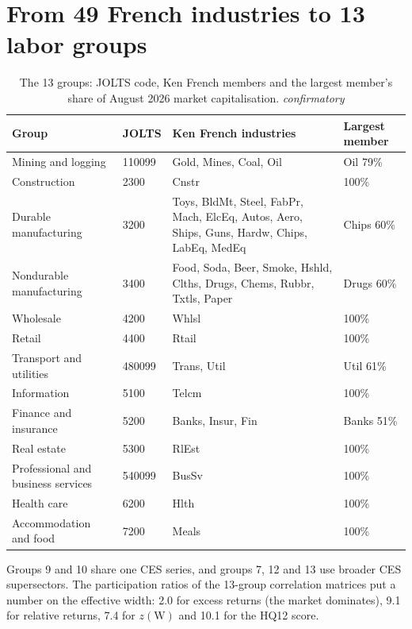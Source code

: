 \documentclass[11pt,letterpaper]{article}
\newcommand{\tagc}{{\footnotesize\itshape confirmatory}}
\begin{document}
\section{From 49 French industries to 13 labor groups}\label{app:mapping}
\begin{table}[H]
\centering\footnotesize
\caption{The 13 groups: JOLTS code, Ken French members and the largest member's share of August 2026 market capitalisation. \hfill\tagc}
\begin{tabularx}{\textwidth}{@{}l l X l@{}}
\toprule
Group & JOLTS & Ken French industries & Largest member \\
\midrule
Mining and logging & 110099 & Gold, Mines, Coal, Oil & Oil 79\% \\
Construction & 2300 & Cnstr & 100\% \\
Durable manufacturing & 3200 & Toys, BldMt, Steel, FabPr, Mach, ElcEq, Autos, Aero, Ships, Guns, Hardw, Chips, LabEq, MedEq & Chips 60\% \\
Nondurable manufacturing & 3400 & Food, Soda, Beer, Smoke, Hshld, Clths, Drugs, Chems, Rubbr, Txtls, Paper & Drugs 60\% \\
Wholesale & 4200 & Whlsl & 100\% \\
Retail & 4400 & Rtail & 100\% \\
Transport and utilities & 480099 & Trans, Util & Util 61\% \\
Information & 5100 & Telcm & 100\% \\
Finance and insurance & 5200 & Banks, Insur, Fin & Banks 51\% \\
Real estate & 5300 & RlEst & 100\% \\
Professional and business services & 540099 & BusSv & 100\% \\
Health care & 6200 & Hlth & 100\% \\
Accommodation and food & 7200 & Meals & 100\% \\
\bottomrule
\end{tabularx}
\end{table}
Groups 9 and 10 share one CES series, and groups 7, 12 and 13 use broader CES
supersectors. The participation ratios of the 13-group correlation matrices put
a number on the effective width: 2.0 for excess returns (the market dominates),
9.1 for relative returns, 7.4 for $z(\text{W})$ and 10.1 for the HQ12 score. %

\end{document}
